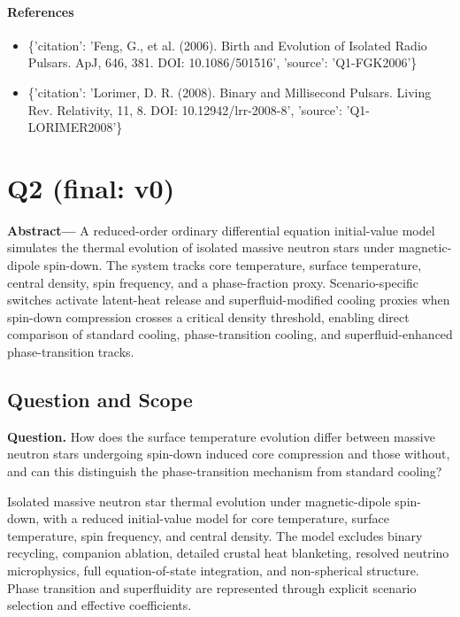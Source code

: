 \documentclass[11pt]{article}
\begin{document}
\paragraph{References}
\begin{itemize}\raggedright
\item \{'citation': 'Feng, G., et al. (2006). Birth and Evolution of Isolated Radio Pulsars. ApJ, 646, 381. DOI: 10.1086/\allowbreak{}501516', 'source': 'Q1-FGK2006'\}
\item \{'citation': 'Lorimer, D. R. (2008). Binary and Millisecond Pulsars. Living Rev. Relativity, 11, 8. DOI: 10.12942/\allowbreak{}lrr-2008-8', 'source': 'Q1-LORIMER2008'\}
\end{itemize}

\section{Q2 (final: v0)}

\noindent\textbf{Abstract—} A reduced-order ordinary differential equation initial-value model simulates the thermal evolution of isolated massive neutron stars under magnetic-dipole spin-down. The system tracks core temperature, surface temperature, central density, spin frequency, and a phase-fraction proxy. Scenario-specific switches activate latent-heat release and superfluid-modified cooling proxies when spin-down compression crosses a critical density threshold, enabling direct comparison of standard cooling, phase-transition cooling, and superfluid-enhanced phase-transition tracks.

\subsection{Question and Scope}

\noindent\textbf{Question.} How does the surface temperature evolution differ between massive neutron stars undergoing spin-down induced core compression and those without, and can this distinguish the phase-transition mechanism from standard cooling?



Isolated massive neutron star thermal evolution under magnetic-dipole spin-down, with a reduced initial-value model for core temperature, surface temperature, spin frequency, and central density. The model excludes binary recycling, companion ablation, detailed crustal heat blanketing, resolved neutrino microphysics, full equation-of-state integration, and non-spherical structure. Phase transition and superfluidity are represented through explicit scenario selection and effective coefficients.
\end{document}
